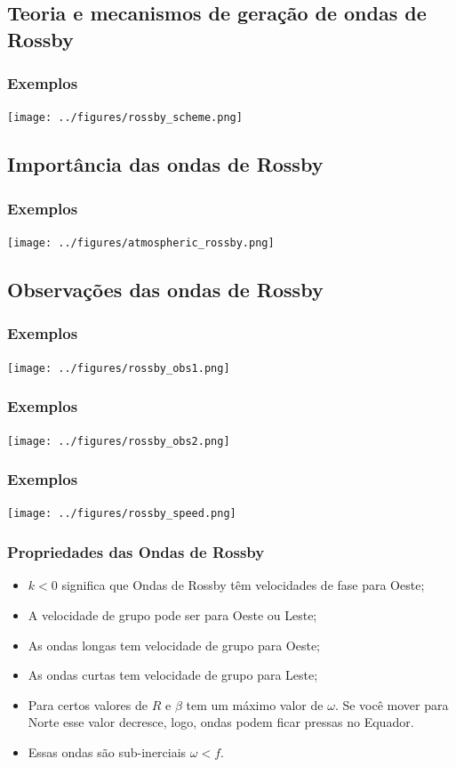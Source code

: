 \subsection{Teoria e mecanismos de geração de ondas de Rossby}
\begin{frame}
  \frametitle{Exemplos}
    \begin{center}
    \texttt{[image: ../figures/rossby\_scheme.png]}
  \end{center}
\end{frame}

\subsection{Importância das ondas de Rossby}
\begin{frame}
  \frametitle{Exemplos}
    \begin{center}
    \texttt{[image: ../figures/atmospheric\_rossby.png]}
  \end{center}
\end{frame}

\subsection{Observações das ondas de Rossby}
\begin{frame}
  \frametitle{Exemplos}
    \begin{center}
    \texttt{[image: ../figures/rossby\_obs1.png]}
  \end{center}
\end{frame}

\begin{frame}
  \frametitle{Exemplos}
    \begin{center}
    \texttt{[image: ../figures/rossby\_obs2.png]}
  \end{center}
\end{frame}


\begin{frame}
  \frametitle{Exemplos}
    \begin{center}
    \texttt{[image: ../figures/rossby\_speed.png]}
  \end{center}
\end{frame}

\begin{frame}
  \frametitle{Propriedades das Ondas de Rossby}
\small{
  \begin{itemize}[<+-| alert@+>]
  \item $k < 0$  significa que Ondas de Rossby têm velocidades de fase
        para Oeste;
  \item A velocidade de grupo pode ser para Oeste ou Leste;
  \item As ondas longas tem velocidade de grupo para Oeste;
  \item As ondas curtas tem velocidade de grupo para Leste;
  \item Para certos valores de $R$ e $\beta$ tem um máximo valor de $\omega$.
        Se você mover para Norte esse valor decresce, logo, ondas podem ficar
        pressas no Equador.
  \item Essas ondas são sub-inerciais $\omega < f$.
  \end{itemize}
}
\end{frame}


